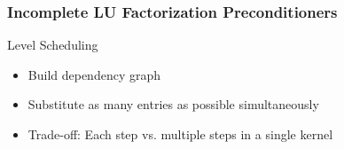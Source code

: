 


\begin{frame}[fragile]
\frametitle{Incomplete LU Factorization Preconditioners}

     \begin{block}{Level Scheduling}
      \begin{itemize}
        \item Build dependency graph
        \item Substitute as many entries as possible simultaneously
        \item Trade-off: Each step vs. multiple steps in a single kernel
      \end{itemize}

      \begin{center}
      \end{center}

    \end{block}
\end{frame}


